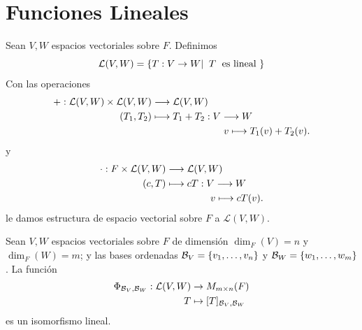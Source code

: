 \documentclass[12pt,a4paper]{book}
\newcommand{\llaves}[1]{\{#1\}}
\begin{document}
    \section{Funciones Lineales}

    Sean $V, W$ espacios vectoriales sobre $F$. Definimos
    \begin{equation*}
        \mathcal{L}(V, W) = \llaves{T:V \to W |\;\;T \text{\; es lineal }}
    \end{equation*}
    Con las operaciones
    \begin{equation*}
        \begin{aligned}
            +:\mathcal{L}(V,W)\times\mathcal{L}(V,W) & \longrightarrow \mathcal{L}(V,W) \\
            (T_{1},T_{2}) & \longmapsto T_{1}+T_{2}:V\longrightarrow W \\
            &\hspace{2.6cm} v\longmapsto T_{1}(v)+T_{2}(v).
        \end{aligned}
    \end{equation*}
    y
    \begin{equation*}
        \begin{aligned}
            \cdot: F \times\mathcal{L}(V,W)
            &\longrightarrow \mathcal{L}(V,W) \\
            (c,T)
            &\longmapsto cT:V\longrightarrow W \\
            &\hspace{1.6cm} v\longmapsto cT(v).
        \end{aligned}
    \end{equation*}
    le damos estructura de espacio vectorial sobre $F$ a $\mathcal{L}(V,W)$.

    \begin{teorema}
    \label{teo:9}
        Sean $V, W$ espacios vectoriales sobre $F$ de dimensión $\dim_{F}(V) = n$ y $\dim_{F}(W) = m$; y las bases ordenadas $\BB_{V} = \llaves{v_{1}, \dots, v_{n}}$ y $\BB_{W} = \llaves{w_{1}, \dots, w_{m}}$. La función
        \begin{align*}
            \Phi_{\mathcal{B}_{V}, \mathcal{B}_{W}}: \mathcal{L}(V, W) & \to M_{m \times n}(F)\\
            T & \mapsto [T]_{\mathcal{B}_{V}, \mathcal{B}_{W}} 
        \end{align*}
        es un isomorfismo lineal.
    \end{teorema}
\end{document}
